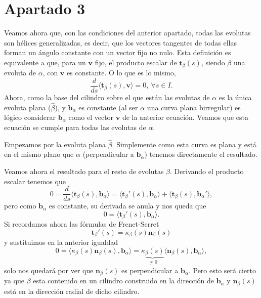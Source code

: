 \section{Apartado 3}
Veamos ahora que, con las condiciones del anterior apartado, todas las evolutas
son hélices generalizadas, es decir, que los vectores tangentes de todas ellas
forman un ángulo constante con un vector fijo no nulo. Esta definición es
equivalente a que, para un $\mathbf{v}$ fijo, el producto escalar de
$\mathbf{t}_{\beta}\left( s \right)$, siendo $\beta$ una evoluta de $\alpha$, con $\mathbf{v}$
es constante. O lo que es lo mismo,
\[
    \frac{d}{ds}\langle \mathbf{t}_{\beta}\left( s \right), \mathbf{v} \rangle
    = 0,\ \forall s \in I.
\]
Ahora, como la base del cilindro sobre el que están las evolutas de $\alpha$ es
la única evoluta plana ($\hat{\beta}$), y $\mathbf{b}_{\alpha}$ es constante (al
ser $\alpha$ una curva plana birregular) es lógico considerar
$\mathbf{b}_{\alpha}$ como el vector $\mathbf{v}$ de la anterior ecuación.
Veamos que esta ecuación se cumple para todas las evolutas de $\alpha$.

Empezamos por la evoluta plana $\hat{\beta}$. Simplemente como esta curva es
plana y está en el mismo plano que $\alpha$ (perpendicular a
$\mathbf{b}_{\alpha}$) tenemos directamente el resultado.

Veamos ahora el resultado para el resto de evolutas $\beta$. Derivando el
producto escalar tenemos que
\[
0 = \frac{d}{ds}\langle \mathbf{t}_{\beta}\left( s \right),
\mathbf{b}_{\alpha} \rangle = \langle
\mathbf{t}_{\beta}'\left( s \right), \mathbf{b}_{\alpha} \rangle
+ \langle \mathbf{t}_{\beta}\left( s \right),
\mathbf{b}_{\alpha}' \rangle,
\]
pero como $\mathbf{b}_{\alpha}$ es constante, su derivada se anula y nos queda
que
\[
0 = \langle \mathbf{t}_{\beta}'\left( s \right), \mathbf{b}_{\alpha} \rangle.
\]
Si recordamos ahora las fórmulas de Frenet-Serret
\[
\mathbf{t}_{\beta}'\left( s \right) = \kappa_{\beta}\left( s \right)\mathbf{n}_{\beta}\left( s \right)
\]
y sustituimos en la anterior igualdad
\[
0 = \langle \kappa_{\beta}\left( s \right)\mathbf{n}_{\beta}\left( s \right),
\mathbf{b}_{\alpha} \rangle = \underbrace{\kappa_{\beta}\left( s \right)}_{\neq 0}\langle
\mathbf{n}_{\beta}\left( s \right), \mathbf{b}_{\alpha} \rangle,
\]
solo nos quedará por ver que $\mathbf{n}_{\beta}\left( s \right)$ es
perpendicular a $\mathbf{b}_{\alpha}$. Pero esto será cierto ya que $\beta$ esta
contenido en un cilindro construido en la dirección de $\mathbf{b}_{\alpha}$ y
$\mathbf{n}_{\beta}\left( s \right)$ está en la dirección radial de dicho
cilindro.

